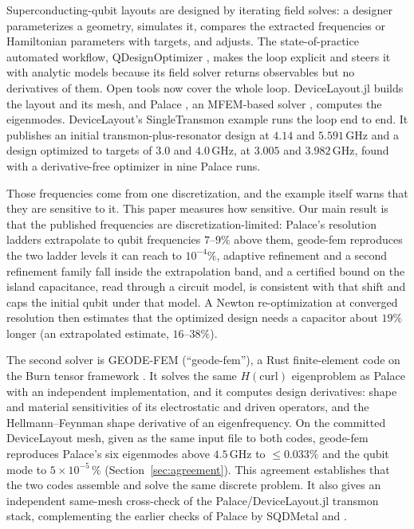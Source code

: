 \documentclass{anvil-paper}
\begin{document}
Superconducting-qubit layouts are designed by iterating field solves: a
designer parameterizes a geometry, simulates it, compares the extracted
frequencies or Hamiltonian parameters with targets, and adjusts. The
state-of-practice automated workflow, QDesignOptimizer
\citep{eriksson2025automated}, makes the loop explicit and steers it with
analytic models because its field solver returns observables but no
derivatives of them. Open tools now cover the whole loop.
DeviceLayout.jl \citep{devicelayout} builds the layout and its mesh, and
Palace \citep{palace}, an MFEM-based solver \citep{mfem,andrej2024high},
computes the eigenmodes. DeviceLayout's SingleTransmon example
\citep{devicelayout-blog,devicelayout-example} runs the loop end to end.
It publishes an initial transmon-plus-resonator design at $4.14$ and
$5.591$\,GHz and a design optimized to targets of $3.0$ and $4.0$\,GHz, at
$3.005$ and $3.982$\,GHz, found with a derivative-free optimizer in nine
Palace runs.

Those frequencies come from one discretization, and the example itself
warns that they are sensitive to it. This paper measures how sensitive.
Our main result is that the published frequencies are
discretization-limited: Palace's resolution ladders extrapolate to qubit
frequencies $7$--$9\%$ above them, geode-fem reproduces the two ladder
levels it can reach to $10^{-4}\%$, adaptive refinement and a second
refinement family fall inside the extrapolation band, and a certified bound
on the island capacitance, read through a circuit model, is consistent with
that shift and caps the initial qubit under that model. A Newton
re-optimization at converged resolution then estimates that the optimized
design needs a capacitor about $19\%$ longer (an extrapolated estimate,
$16$--$38\%$).

The second solver is GEODE-FEM (``geode-fem''), a Rust finite-element code
on the Burn tensor framework \citep{burn}. It solves the same
$H(\mathrm{curl})$ eigenproblem as Palace with an independent
implementation, and it computes design derivatives: shape and material
sensitivities of its electrostatic and driven operators, and the
Hellmann--Feynman shape derivative of an eigenfrequency. On the
committed DeviceLayout mesh, given as the same input file to both codes,
geode-fem reproduces Palace's six eigenmodes above $4.5$\,GHz to
$\leq 0.033\%$ and the qubit mode to $5\times10^{-5}\,\%$
(Section~\ref{sec:agreement}). This agreement establishes that the two codes
assemble and solve the same discrete problem. It also gives an independent
same-mesh cross-check of the Palace/DeviceLayout.jl transmon stack,
complementing the earlier checks of Palace by SQDMetal
\citep{sommers2025open} and \citet{ye2025electromagnetic}.
\end{document}
